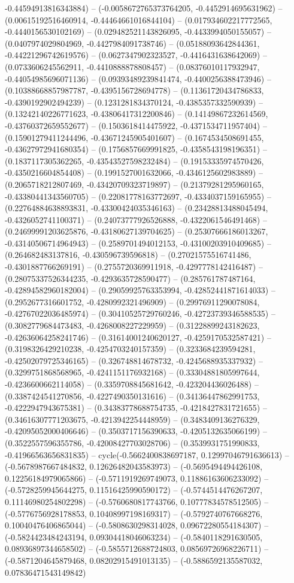 -0.44594913816343884) -- (-0.0058672765373764205, -0.4452914695631962) -- (0.00615192516460914, -0.44464661016844104) -- (0.017934602217772565, -0.4440156530102169) -- (0.029482521143826095, -0.4433994050155057) -- (0.0407974029804969, -0.4427984091738746) -- (0.05188093642844361, -0.44221296742619576) -- (0.0627347902323527, -0.4416431638642069) -- (0.0733606245562911, -0.4410888878808457) -- (0.08376010117932947, -0.44054985696071136) -- (0.09393489239841474, -0.4400256388473946) -- (0.10388668857987787, -0.4395156728694778) -- (0.11361720434786833, -0.4390192902494239) -- (0.1231281834370124, -0.4385357332590939) -- (0.13242140226771623, -0.43806417312200846) -- (0.14149867232614569, -0.43760372659552677) -- (0.1503618414475922, -0.4371534711957404) -- (0.15901279411244496, -0.43671245905401607) -- (0.1674534508691455, -0.43627972941680354) -- (0.1756857669991825, -0.4358543198196351) -- (0.1837117305362265, -0.43543527598232484) -- (0.19153335974570426, -0.4350216604854408) -- (0.1991527001632066, -0.4346125602983889) -- (0.2065718212807469, -0.43420709323719897) -- (0.21379281295960165, -0.43380441343560705) -- (0.22081778163772697, -0.4334037159165955) -- (0.22764884638893831, -0.43300424035346163) -- (0.23428813488045494, -0.4326052741100371) -- (0.24073777926526888, -0.4322061546491468) -- (0.24699991203625876, -0.43180627139704625) -- (0.25307666186013267, -0.43140506714964943) -- (0.2589701494012153, -0.43100203910409685) -- (0.264682483137816, -0.430596739596818) -- (0.27021575516741486, -0.4301887766269191) -- (0.2755720369911918, -0.4297778142416487) -- (0.28075337526344235, -0.4293635728590477) -- (0.285761787487164, -0.42894582960182004) -- (0.29059925763353994, -0.42852441871614033) -- (0.2952677316601752, -0.4280992321496909) -- (0.29976911290078084, -0.42767022036485974) -- (0.30410525729760246, -0.42723739346588535) -- (0.3082779684473483, -0.4268008227229959) -- (0.31228899243182623, -0.42636064258241746) -- (0.31614001240620127, -0.4259170532587421) -- (0.3198326429210238, -0.4254703240157359) -- (0.3233684239594281, -0.42502079725346165) -- (0.326748814678732, -0.4245688935337932) -- (0.3299751868568965, -0.4241151176932168) -- (0.33304881805997644, -0.4236600662114058) -- (0.3359708845681642, -0.423204436026488) -- (0.3387424541270856, -0.4227490350131616) -- (0.34136447862991753, -0.4222947943675381) -- (0.34383778688754735, -0.4218427831721655) -- (0.34616307771203675, -0.4213942254448959) -- (0.3483409136276329, -0.42095052000406646) -- (0.3503717156390633, -0.4205132635066199) -- (0.3522557596355786, -0.42008427703028706) -- (0.3539931751990833, -0.41966563656831835) -- cycle(-0.5662400838697187, 0.12997046791636613) -- (-0.5678987667484832, 0.12626482043583973) -- (-0.5695494494426108, 0.12256184979065866) -- (-0.5711919269749073, 0.11886163606233092) -- (-0.5728259945644275, 0.11516425990590172) -- (-0.5744514476267207, 0.11146980254802298) -- (-0.5760680817743766, 0.10777834578512505) -- (-0.5776756928178853, 0.10408997198169317) -- (-0.5792740767668276, 0.10040476406865044) -- (-0.5808630298314028, 0.09672280554184307) -- (-0.5824423484243194, 0.09304418046063234) -- (-0.5840118291630505, 0.08936897344658502) -- (-0.5855712688724803, 0.08569726968226711) -- (-0.5871204645879468, 0.08202915491013135) -- (-0.5886592135587032, 0.07836471543149842) 